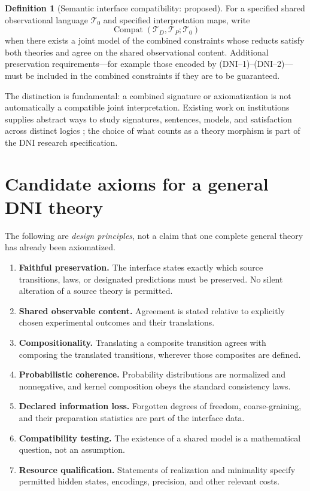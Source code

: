 \documentclass[11pt,letterpaper]{article}
\theoremstyle{definition}
\newtheorem{definition}[theorem]{Definition}
\theoremstyle{remark}
\newcommand{\TT}{\mathcal T}
\newcommand{\Compat}{\operatorname{Compat}}
\begin{document}
\begin{definition}[Semantic interface compatibility: proposed]\label{def:compatible}
For a specified shared observational language $\TT_0$ and specified interpretation maps, write
\[
\Compat(\TT_D,\TT_P;\TT_0)
\]
when there exists a joint model of the combined constraints whose reducts satisfy both theories and agree on the shared observational content. Additional preservation requirements---for example those encoded by (DNI--1)--(DNI--2)---must be included in the combined constraints if they are to be guaranteed.
\end{definition}

The distinction is fundamental: a combined signature or axiomatization is not automatically a compatible joint interpretation. Existing work on institutions supplies abstract ways to study signatures, sentences, models, and satisfaction across distinct logics \cite{goguen1992}; the choice of what counts as a theory morphism is part of the DNI research specification.

\section{Candidate axioms for a general DNI theory}
The following are \emph{design principles}, not a claim that one complete general theory has already been axiomatized.
\begin{enumerate}[label=\textbf{I\arabic*.}]
\item \textbf{Faithful preservation.} The interface states exactly which source transitions, laws, or designated predictions must be preserved. No silent alteration of a source theory is permitted.
\item \textbf{Shared observable content.} Agreement is stated relative to explicitly chosen experimental outcomes and their translations.
\item \textbf{Compositionality.} Translating a composite transition agrees with composing the translated transitions, wherever those composites are defined.
\item \textbf{Probabilistic coherence.} Probability distributions are normalized and nonnegative, and kernel composition obeys the standard consistency laws.
\item \textbf{Declared information loss.} Forgotten degrees of freedom, coarse-graining, and their preparation statistics are part of the interface data.
\item \textbf{Compatibility testing.} The existence of a shared model is a mathematical question, not an assumption.
\item \textbf{Resource qualification.} Statements of realization and minimality specify permitted hidden states, encodings, precision, and other relevant costs.
\end{enumerate}
\end{document}
